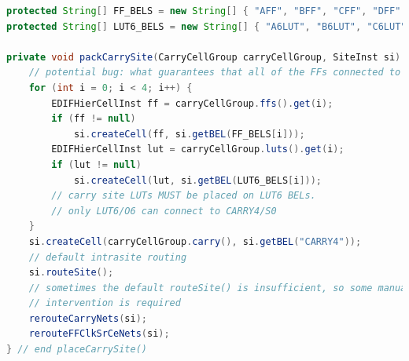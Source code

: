 \begin{lstlisting}[language=java, caption={Packing an individual \texttt{CarryCellGroup} into one \texttt{SLICEL} \texttt{SiteInst}s.}, label={lst:single_carry_chains}]
protected String[] FF_BELS = new String[] { "AFF", "BFF", "CFF", "DFF" };
protected String[] LUT6_BELS = new String[] { "A6LUT", "B6LUT", "C6LUT", "D6LUT" };

private void packCarrySite(CarryCellGroup carryCellGroup, SiteInst si) {
    // potential bug: what guarantees that all of the FFs connected to the CARRY4 all share the same CE and Reset?
    for (int i = 0; i < 4; i++) {
        EDIFHierCellInst ff = carryCellGroup.ffs().get(i);
        if (ff != null)
            si.createCell(ff, si.getBEL(FF_BELS[i]));
        EDIFHierCellInst lut = carryCellGroup.luts().get(i);
        if (lut != null)
            si.createCell(lut, si.getBEL(LUT6_BELS[i]));
        // carry site LUTs MUST be placed on LUT6 BELs.
        // only LUT6/O6 can connect to CARRY4/S0
    }
    si.createCell(carryCellGroup.carry(), si.getBEL("CARRY4"));
    // default intrasite routing
    si.routeSite();
    // sometimes the default routeSite() is insufficient, so some manual
    // intervention is required
    rerouteCarryNets(si);
    rerouteFFClkSrCeNets(si);
} // end placeCarrySite()
\end{lstlisting}

